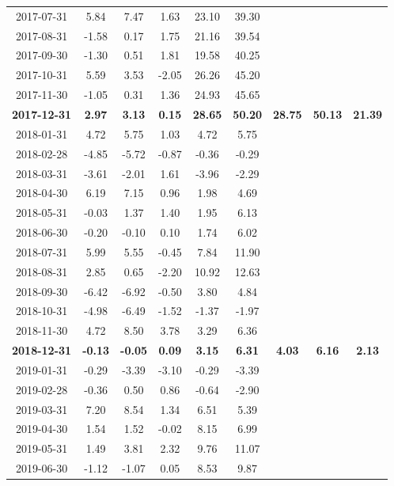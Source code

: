 \begin{longtable}{ccccccccc}
2017-07-31 & 5.84 & 7.47 & 1.63 & 23.10 & 39.30 &  &  &  \\
2017-08-31 & -1.58 & 0.17 & 1.75 & 21.16 & 39.54 &  &  &  \\
2017-09-30 & -1.30 & 0.51 & 1.81 & 19.58 & 40.25 &  &  &  \\
2017-10-31 & 5.59 & 3.53 & -2.05 & 26.26 & 45.20 &  &  &  \\
2017-11-30 & -1.05 & 0.31 & 1.36 & 24.93 & 45.65 &  &  &  \\
\textbf{2017-12-31} & \textbf{2.97} & \textbf{3.13} & \textbf{0.15} & \textbf{28.65} & \textbf{50.20} & \textbf{28.75} & \textbf{50.13} & \textbf{21.39} \\
\midrule
2018-01-31 & 4.72 & 5.75 & 1.03 & 4.72 & 5.75 &  &  &  \\
2018-02-28 & -4.85 & -5.72 & -0.87 & -0.36 & -0.29 &  &  &  \\
2018-03-31 & -3.61 & -2.01 & 1.61 & -3.96 & -2.29 &  &  &  \\
2018-04-30 & 6.19 & 7.15 & 0.96 & 1.98 & 4.69 &  &  &  \\
2018-05-31 & -0.03 & 1.37 & 1.40 & 1.95 & 6.13 &  &  &  \\
2018-06-30 & -0.20 & -0.10 & 0.10 & 1.74 & 6.02 &  &  &  \\
2018-07-31 & 5.99 & 5.55 & -0.45 & 7.84 & 11.90 &  &  &  \\
2018-08-31 & 2.85 & 0.65 & -2.20 & 10.92 & 12.63 &  &  &  \\
2018-09-30 & -6.42 & -6.92 & -0.50 & 3.80 & 4.84 &  &  &  \\
2018-10-31 & -4.98 & -6.49 & -1.52 & -1.37 & -1.97 &  &  &  \\
2018-11-30 & 4.72 & 8.50 & 3.78 & 3.29 & 6.36 &  &  &  \\
\textbf{2018-12-31} & \textbf{-0.13} & \textbf{-0.05} & \textbf{0.09} & \textbf{3.15} & \textbf{6.31} & \textbf{4.03} & \textbf{6.16} & \textbf{2.13} \\
\midrule
2019-01-31 & -0.29 & -3.39 & -3.10 & -0.29 & -3.39 &  &  &  \\
2019-02-28 & -0.36 & 0.50 & 0.86 & -0.64 & -2.90 &  &  &  \\
2019-03-31 & 7.20 & 8.54 & 1.34 & 6.51 & 5.39 &  &  &  \\
2019-04-30 & 1.54 & 1.52 & -0.02 & 8.15 & 6.99 &  &  &  \\
2019-05-31 & 1.49 & 3.81 & 2.32 & 9.76 & 11.07 &  &  &  \\
2019-06-30 & -1.12 & -1.07 & 0.05 & 8.53 & 9.87 &  &  &  \\

\end{longtable}
